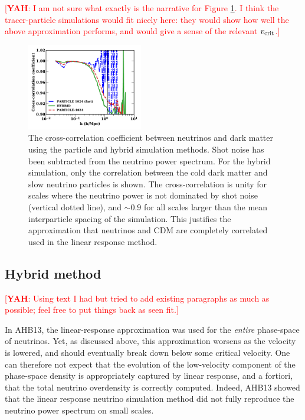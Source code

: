 \documentclass[useAMS, usenatbib]{mnras}
\newcommand{\yah}[1]{{\textcolor{red}{[{\bf YAH}: #1]}}}
\begin{document}
\yah{I am not sure what exactly is the narrative for Figure \ref{fig:cross-corr}. I think the tracer-particle simulations would fit nicely here: they would show how well the above approximation performs, and would give a sense of the relevant $v_{\rm crit}$.}

\begin{figure}
\includegraphics[width=0.45\textwidth]{nuplots/corr_coeff-1.pdf}
  \caption{The cross-correlation coefficient between neutrinos and dark matter using the particle and hybrid simulation methods.
  Shot noise has been subtracted from the neutrino power spectrum. For the hybrid simulation, only the correlation between the
  cold dark matter and slow neutrino particles is shown.
  The cross-correlation is unity for scales where the neutrino power is not dominated by shot noise (vertical dotted line),
  and $\sim 0.9$ for all scales larger than the mean interparticle spacing of the simulation. This justifies the
  approximation that neutrinos and CDM are completely correlated used in the linear response method.
  }
  \label{fig:cross-corr}
\end{figure}

\subsection{Hybrid method} \label{sec:hybrid}

\yah{Using text I had but tried to add existing paragraphs as much as possible; feel free to put things back as seen fit.}

In AHB13, the linear-response approximation was used for the \emph{entire} phase-space of neutrinos. Yet, as discussed above, this approximation worsens as the velocity is lowered, and should eventually break down below some critical velocity. One can therefore not expect that the evolution of the low-velocity component of the phase-space density is appropriately captured by linear response, and a fortiori, that the total neutrino overdensity is correctly computed. Indeed, AHB13 showed that the linear response neutrino simulation method did not fully reproduce the neutrino power spectrum on small scales.
\end{document}
